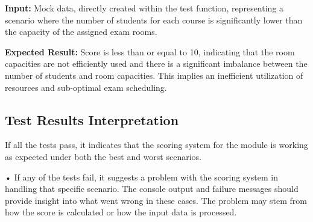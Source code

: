 \vspace{\baselineskip}


 \textbf{Input:}
Mock data, directly created within the test function, representing a scenario where the
number of students for each course is significantly lower than the capacity of the assigned exam
rooms.
 
\vspace{\baselineskip}

 
 \textbf{Expected Result:}
Score is less than or equal to 10, indicating that the room capacities are not
efficiently used and there is a significant imbalance between the number of students and room
capacities. This implies an inefficient utilization of resources and sub-optimal exam scheduling.

\vspace{\baselineskip}

\subsection{Test Results Interpretation}


If all the tests pass, it indicates that the scoring system for the module is working as
expected under both the best and worst scenarios.

\vspace{\baselineskip}


• If any of the tests fail, it suggests a problem with the scoring system in handling that specific
scenario. The console output and failure messages should provide insight into what went
wrong in these cases. The problem may stem from how the score is calculated or how the
input data is processed.